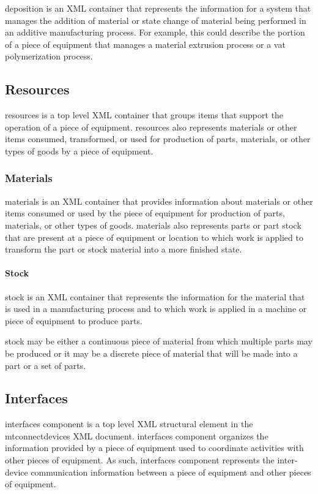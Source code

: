 \documentclass{mtconnect}	%
\providecommand{\DIFadd}[1]{{\hspace{0pt}\protect\color{blue}#1}} %
\providecommand{\DIFaddend}{} %
\begin{document}
\DIFadd{\gls{deposition} is an XML container that represents the information for a system that manages the addition of material or state change of material being performed in an additive manufacturing process.  For example, this could describe the portion of a piece of equipment that manages a material extrusion process or a vat polymerization process.
}


\DIFaddend \subsection{Resources}

\gls{resources} is a \gls{top level} XML container that groups items that support the operation of a piece of equipment.   \gls{resources} also represents materials or other items consumed, transformed, or used for production of parts, materials, or other types of goods by a piece of equipment.

\subsubsection{Materials}

\gls{materials} is an XML container that provides information about materials or other items consumed or used by the piece of equipment for production of parts, materials, or other types of goods.  \gls{materials} also represents parts or part stock that are present at a piece of equipment or location to which work is applied to transform the part or stock material into a more finished state. 

\paragraph{Stock}\mbox{}

\gls{stock} is an XML container that represents the information for the material that is used in a manufacturing process and to which work is applied in a machine or piece of equipment to produce parts.

\gls{stock} may be either a continuous piece of material from which multiple parts may be produced or it may be a discrete piece of material that will be made into a part or a set of parts.

\subsection{Interfaces}

\gls{interfaces component} is a \gls{top level} XML \gls{structural element} in the \gls{mtconnectdevices} XML document.  \gls{interfaces component} organizes the information provided by a piece of equipment used to coordinate activities with other pieces of equipment.   As such, \gls{interfaces component} represents the inter-device communication information between a piece of equipment and other pieces of equipment.
\end{document}
